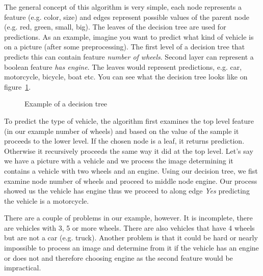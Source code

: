 The general concept of this algorithm is very simple, each node represents a feature (e.g. color, size) and edges represent possible values of the parent node (e.g. red, green, small, big). The leaves of the decision tree are used for predictions. As an example, imagine you want to predict what kind of vehicle is on a picture (after some preprocessing). The first level of a decision tree that predicts this can contain feature \textit{number of wheels}. Second layer can represent a boolean feature \textit{has engine}. The leaves would represent predictions, e.g. car, motorcycle, bicycle, boat etc. You can see what the decision tree looks like on figure~\ref{fig:decision.tree.example}.

\begin{figure}[htbp]
    \centering
    \caption{Example of a decision tree}
    \label{fig:decision.tree.example}
\end{figure}

To predict the type of vehicle, the algorithm first examines the top level feature (in our example number of wheels) and based on the value of the sample it proceeds to the lower level. If the chosen node is a leaf, it returns prediction. Otherwise it recursively proceeds the same way it did at the top level. Let's say we have a picture with a vehicle and we process the image determining it contains a vehicle with two wheels and an engine. Using our decision tree, we fist examine node number of wheels and proceed to middle node engine. Our process showed us the vehicle has engine thus we proceed to along edge \textit{Yes} predicting the vehicle is a motorcycle.

There are a couple of problems in our example, however. It is incomplete, there are vehicles with 3, 5 or more wheels. There are also vehicles that have 4 wheels but are not a car (e.g. truck). Another problem is that it could be hard or nearly impossible to process an image and determine from it if the vehicle has an engine or does not and therefore choosing engine as the second feature would be impractical.

